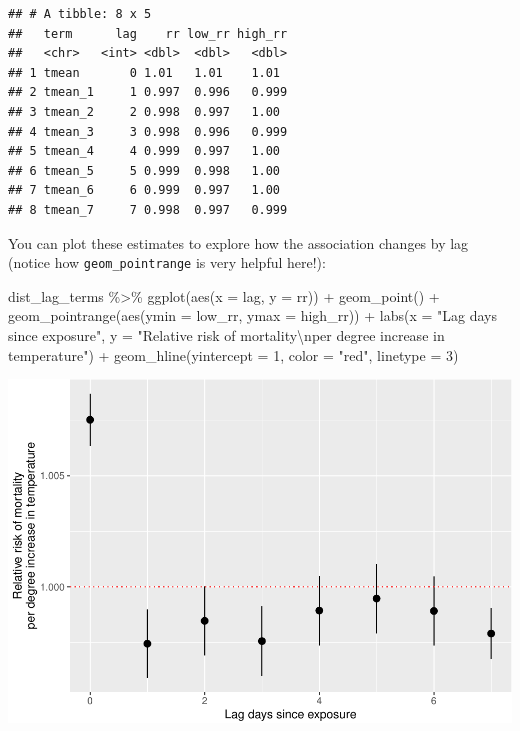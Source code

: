 \documentclass[
]{book}
\newenvironment{Shaded}{\begin{snugshade}}{\end{snugshade}}
\newcommand{\AttributeTok}[1]{\textcolor[rgb]{0.77,0.63,0.00}{#1}}
\newcommand{\DecValTok}[1]{\textcolor[rgb]{0.00,0.00,0.81}{#1}}
\newcommand{\FunctionTok}[1]{\textcolor[rgb]{0.00,0.00,0.00}{#1}}
\newcommand{\NormalTok}[1]{#1}
\newcommand{\SpecialCharTok}[1]{\textcolor[rgb]{0.00,0.00,0.00}{#1}}
\newcommand{\StringTok}[1]{\textcolor[rgb]{0.31,0.60,0.02}{#1}}
\begin{document}
\begin{verbatim}
## # A tibble: 8 x 5
##   term      lag    rr low_rr high_rr
##   <chr>   <int> <dbl>  <dbl>   <dbl>
## 1 tmean       0 1.01   1.01    1.01 
## 2 tmean_1     1 0.997  0.996   0.999
## 3 tmean_2     2 0.998  0.997   1.00 
## 4 tmean_3     3 0.998  0.996   0.999
## 5 tmean_4     4 0.999  0.997   1.00 
## 6 tmean_5     5 0.999  0.998   1.00 
## 7 tmean_6     6 0.999  0.997   1.00 
## 8 tmean_7     7 0.998  0.997   0.999
\end{verbatim}

You can plot these estimates to explore how the association changes by lag (notice how
\texttt{geom\_pointrange} is very helpful here!):

\begin{Shaded}
\begin{Highlighting}[]
\NormalTok{dist\_lag\_terms }\SpecialCharTok{\%\textgreater{}\%} 
  \FunctionTok{ggplot}\NormalTok{(}\FunctionTok{aes}\NormalTok{(}\AttributeTok{x =}\NormalTok{ lag, }\AttributeTok{y =}\NormalTok{ rr)) }\SpecialCharTok{+} 
  \FunctionTok{geom\_point}\NormalTok{() }\SpecialCharTok{+} 
  \FunctionTok{geom\_pointrange}\NormalTok{(}\FunctionTok{aes}\NormalTok{(}\AttributeTok{ymin =}\NormalTok{ low\_rr, }\AttributeTok{ymax =}\NormalTok{ high\_rr)) }\SpecialCharTok{+} 
  \FunctionTok{labs}\NormalTok{(}\AttributeTok{x =} \StringTok{"Lag days since exposure"}\NormalTok{, }
       \AttributeTok{y =} \StringTok{"Relative risk of mortality}\SpecialCharTok{\textbackslash{}n}\StringTok{per degree increase in temperature"}\NormalTok{) }\SpecialCharTok{+} 
  \FunctionTok{geom\_hline}\NormalTok{(}\AttributeTok{yintercept =} \DecValTok{1}\NormalTok{, }\AttributeTok{color =} \StringTok{"red"}\NormalTok{, }\AttributeTok{linetype =} \DecValTok{3}\NormalTok{)}
\end{Highlighting}
\end{Shaded}

\includegraphics{adv_epi_analysis_files/figure-latex/unnamed-chunk-90-1.pdf}
\end{document}
